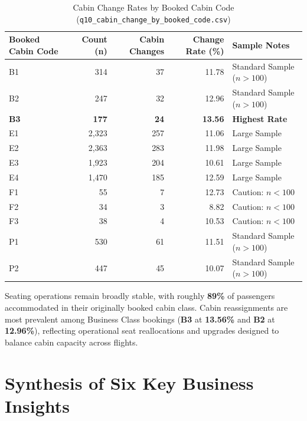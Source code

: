 \documentclass[12pt, a4paper]{report}
\newcommand{\code}[1]{\texttt{\small\color{DarkSlate}#1}}
\newcommand{\pct}[1]{\textbf{#1\%}}
\begin{document}
\begin{table}[H]
  \centering
  \caption{Cabin Change Rates by Booked Cabin Code (\code{q10\_cabin\_change\_by\_booked\_code.csv})}
  \label{tab:q10_cabin}
  \renewcommand{\arraystretch}{1.25}
  \begin{tabularx}{\textwidth}{l rrr >{\raggedright\arraybackslash}X}
    \toprule
    \rowcolor{TableHead}
    \textbf{Booked Cabin Code} & \textbf{Count (n)} & \textbf{Cabin Changes} & \textbf{Change Rate (\%)} & \textbf{Sample Notes} \\
    \midrule
    B1 & 314   & 37  & 11.78 & Standard Sample ($n > 100$) \\
    \rowcolor{TableAlt}
    B2 & 247   & 32  & 12.96 & Standard Sample ($n > 100$) \\
    \textbf{B3} & \textbf{177} & \textbf{24} & \textbf{13.56} & \textbf{Highest Rate} \\
    \rowcolor{TableAlt}
    E1 & 2,323 & 257 & 11.06 & Large Sample \\
    E2 & 2,363 & 283 & 11.98 & Large Sample \\
    \rowcolor{TableAlt}
    E3 & 1,923 & 204 & 10.61 & Large Sample \\
    E4 & 1,470 & 185 & 12.59 & Large Sample \\
    \rowcolor{TableAlt}
    F1 & 55    & 7   & 12.73 & \textcolor{AccentRed}{Caution: $n < 100$} \\
    F2 & 34    & 3   & 8.82  & \textcolor{AccentRed}{Caution: $n < 100$} \\
    \rowcolor{TableAlt}
    F3 & 38    & 4   & 10.53 & \textcolor{AccentRed}{Caution: $n < 100$} \\
    P1 & 530   & 61  & 11.51 & Standard Sample ($n > 100$) \\
    \rowcolor{TableAlt}
    P2 & 447   & 45  & 10.07 & Standard Sample ($n > 100$) \\
    \bottomrule
  \end{tabularx}
\end{table}

Seating operations remain broadly stable, with roughly \pct{89} of passengers accommodated in their originally booked cabin class. Cabin reassignments are most prevalent among Business Class bookings (\textbf{B3} at \pct{13.56} and \textbf{B2} at \pct{12.96}), reflecting operational seat reallocations and upgrades designed to balance cabin capacity across flights.

\section{Synthesis of Six Key Business Insights}
\end{document}
